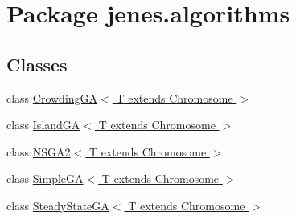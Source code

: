 \hypertarget{namespacejenes_1_1algorithms}{\section{Package jenes.\-algorithms}
\label{namespacejenes_1_1algorithms}
}
\subsection*{Classes}
\begin{DoxyCompactItemize}
\item 
class \hyperlink{classjenes_1_1algorithms_1_1_crowding_g_a_3_01_t_01extends_01_chromosome_01_4}{Crowding\-G\-A$<$ T extends Chromosome $>$}
\item 
class \hyperlink{classjenes_1_1algorithms_1_1_island_g_a_3_01_t_01extends_01_chromosome_01_4}{Island\-G\-A$<$ T extends Chromosome $>$}
\item 
class \hyperlink{classjenes_1_1algorithms_1_1_n_s_g_a2_3_01_t_01extends_01_chromosome_01_4}{N\-S\-G\-A2$<$ T extends Chromosome $>$}
\item 
class \hyperlink{classjenes_1_1algorithms_1_1_simple_g_a_3_01_t_01extends_01_chromosome_01_4}{Simple\-G\-A$<$ T extends Chromosome $>$}
\item 
class \hyperlink{classjenes_1_1algorithms_1_1_steady_state_g_a_3_01_t_01extends_01_chromosome_01_4}{Steady\-State\-G\-A$<$ T extends Chromosome $>$}
\end{DoxyCompactItemize}
